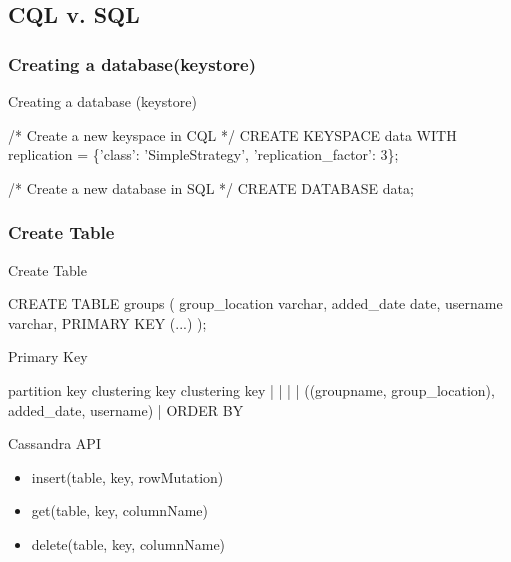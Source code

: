 \documentclass[
  10pt
]{beamer}
\begin{document}
\subsection{CQL v. SQL}
\subsubsection{Creating a database(keystore)}
\begin{frame}[fragile]{Creating a database (keystore) \cite{cqlAlexMeng}} %
  \begin{semiverbatim}
/* Create a new keyspace in CQL */
CREATE KEYSPACE data WITH replication =
\{'class': 'SimpleStrategy', 'replication_factor': 3\};

/* Create a new database in SQL */
CREATE DATABASE data;
  \end{semiverbatim}
\end{frame}

\subsubsection{Create Table}

\begin{frame}[fragile]{Create Table \cite{cqlAlexMeng, newInCQL3}}
  \begin{semiverbatim}
CREATE TABLE groups (
   group_location varchar,
   added_date date,
   username varchar,
   PRIMARY KEY (...)
);
  \end{semiverbatim}
\end{frame}

\begin{frame}[fragile]{Primary Key \cite{cqlPrimaryKeyDefinition}}
  \begin{semiverbatim}
      partition key       clustering key  clustering key
       |       |                |            |
((groupname, group_location), added_date, username)
                                |
                            ORDER BY
  \end{semiverbatim}
\end{frame}

\begin{frame}{Cassandra API \cite{cassandra_paper}}
  \begin{itemize}
    \item insert(table, key, rowMutation) \\
    \item get(table, key, columnName) \\
    \item delete(table, key, columnName) \\
  \end{itemize}
\end{frame}
\end{document}
